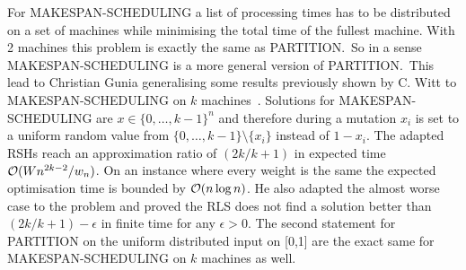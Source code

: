 For MAKESPAN-SCHEDULING a list of processing times has to be distributed on a set of machines while minimising the total time of the fullest machine.
With 2 machines this problem is exactly the same as PARTITION.\
So in a sense MAKESPAN-SCHEDULING is a more general version of PARTITION.\
This lead to Christian Gunia generalising some results previously shown by C. Witt to MAKESPAN-SCHEDULING on $k$ machines~\cite{gunia2005analysis}.
Solutions for MAKESPAN-SCHEDULING are \(x\in{\{0,\dots,k-1\}}^n\) and therefore during a mutation $x_i$ is set to a uniform random value from $\{0,\dots,k-1\}\text{\textbackslash}\{x_i\}$ instead of $1-x_i$.
The adapted RSHs reach an approximation ratio of $(2k/k+1)$ in expected time $\mathcal{O}(Wn^{2k-2}/w_n)$.
On an instance where every weight is the same the expected optimisation time is bounded by $\mathcal{O}(n\log{n})$.
He also adapted the almost worse case to the problem and proved the RLS does not find a solution better than \((2k/k+1)-\epsilon\) in finite time for any $\epsilon>0$.
The second statement for PARTITION on the uniform distributed input on [0,1] are the exact same for MAKESPAN-SCHEDULING on $k$ machines as well.